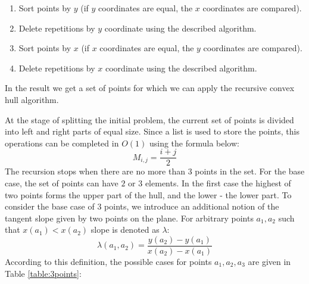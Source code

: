 \documentclass[twoside,twocolumn,10pt]{article}
\begin{document}
		\begin{enumerate}
			\item
			Sort points by $y$ (if $y$ coordinates are equal, the $x$ coordinates are compared).
			\item
			Delete repetitions by $y$ coordinate using the described algorithm.
			\item
			Sort points by $x$ (if $x$ coordinates are equal, the $y$ coordinates are compared).
			\item
			Delete repetitions by $x$ coordinate using the described algorithm.
		\end{enumerate}

		In the result we get a set of points for which we can apply the recursive convex hull algorithm.


		At the stage of splitting the initial problem, the current set of points is divided into left and right parts of equal size. Since a list is used to store the points, this operations can be completed in $O(1)$ using the formula below:
		\begin{equation}
			M_{i,j}=\frac{i+j}{2}
		\end{equation}
		The recursion stops when there are no more than $3$ points in the set.
		For the base case, the set of points can have $2$ or $3$ elements. In the first case the highest of two points forms the upper part of the hull, and the lower - the lower part.
		To consider the base case of $3$ points, we introduce an additional notion of the tangent slope given by two points on the plane. For arbitrary points $a_1, a_2$ such that $x(a_1)<x(a_2)$ slope is denoted as $\lambda$:
		\begin{equation}
			\lambda(a_1, a_2)=\frac{y(a_2)-y(a_1)}{x(a_2)-x(a_1)}
		\end{equation}
		According to this definition, the possible cases for points $a_1,a_2,a_3$ are given in Table \ref{table:3points}:
\end{document}
